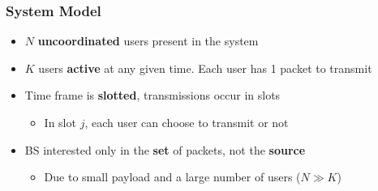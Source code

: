 \begin{frame}
\frametitle{System Model}

\begin{itemize}
  \item $N$ \textbf{uncoordinated} users present in the system
  \item $K$ users \textbf{active} at any given time. Each user has 1 packet to transmit
  \item Time frame is \textbf{slotted}, transmissions occur in slots
   \begin{itemize}
	   \item In slot $j$, each user can choose to transmit or not
	\end{itemize}
   \item<2-> BS interested only in the \textbf{set} of packets, not the \textbf{source}
	\begin{itemize}
	   \item<2-> Due to small payload and a large number of users ($N\gg K$)
	 \end{itemize}
   
\end{itemize}

 \begin{center}
  
  \end{center}
\end{frame}

